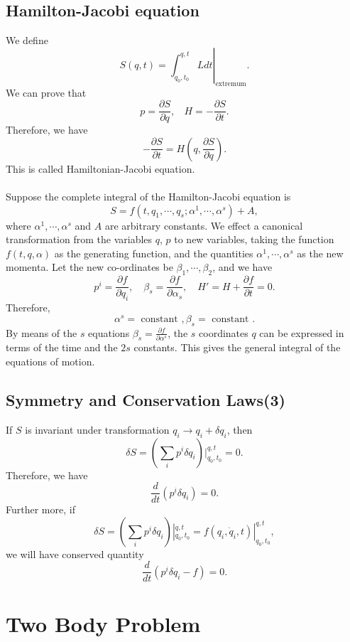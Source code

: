 \section{Hamilton-Jacobi equation}
We define
\[S(q,t)=\left. \int_{q_0,t_0}^{q,t} L dt\right|_{\mathrm{extremum}}.\]
We can prove that
\[p = \frac{\partial S}{\partial q}, \ \ \ \ H = -\frac{\partial S}{\partial t}.\]
Therefore, we have
\[-\frac{\partial S}{\partial t} = H (q,\frac{\partial S}{\partial q}).\]
This is called Hamiltonian-Jacobi equation.\\ \\
Suppose the complete integral of the Hamilton-Jacobi equation is
\[S=f(t,q_1,\cdots,q_s;\alpha^1,\cdots,\alpha^s)+A,\]
where $\alpha^1,\cdots,\alpha^s$ and $A$ are arbitrary constants. 
We effect a canonical transformation from the variables $q$, $p$ to new variables, taking the function $f(t,q,\alpha)$ as the generating function, and the quantities $\alpha^1,\cdots,\alpha^s$ as the new momenta.
Let the new co-ordinates be $\beta_1,\cdots,\beta_2$, and we have
\[p^i = \frac{\partial f}{\partial q_i} ,\quad \beta_s = \frac{\partial f}{\partial \alpha_s} ,\quad H' = H + \frac{\partial f}{\partial t} =0.\]
Therefore,
\[\alpha^s = \mbox{ constant }, \beta_s = \mbox{ constant }.\]
By means of the $s$ equations $\beta_s = \frac{\partial f}{\partial \alpha^s}$, the $s$ coordinates $q$ can be expressed in terms of the time and the $2s$ constants. This gives the general integral of the equations of motion.

\section{Symmetry and Conservation Laws(3)}
If $S$ is invariant under transformation $q_i \rightarrow q_i + \delta q_i$, then 
\[\delta S = (\sum_i p^i \delta q_i) |_{q_0,t_0}^{q,t} = 0.\]
Therefore, we have
\[\frac{d}{dt} (p^i \delta q_i) = 0.\]
Further more, if
\[\delta S = (\sum_i p^i \delta q_i) |_{q_0,t_0}^{q,t} =  f(q_i,\dot{q}_i,t)|_{q_0,t_0}^{q,t}, \]
we will have conserved quantity
\[\frac{d}{dt} (p^i \delta q_i -f) = 0.\]

\chapter{Two Body Problem}
